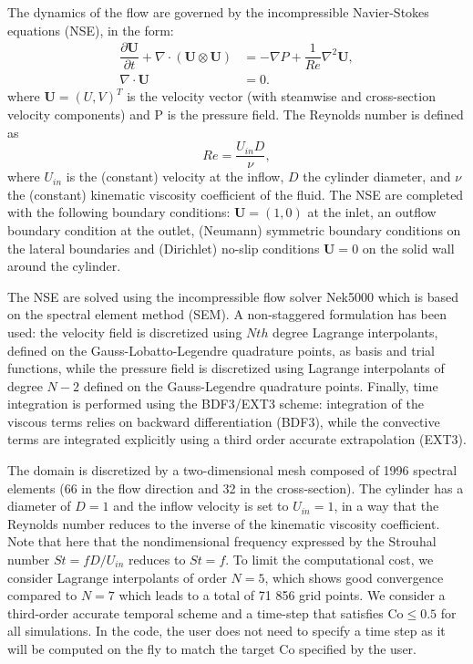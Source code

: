 \documentclass{article}
\begin{document}
The dynamics of the flow are governed by the incompressible Navier-Stokes equations (NSE), in the form:
\begin{align}
\dfrac{\partial \mathbf{U}}{\partial t} + \nabla \cdot \left( \mathbf{U} \otimes \mathbf{U} \right) &= -\nabla P + \dfrac{1}{Re} \nabla^2 \mathbf{U},\\
\nabla \cdot \mathbf{U}&=0.
\end{align}
where $\mathbf{U}=(U,V)^T$ is the velocity vector (with steamwise and cross-section velocity components) and P is the pressure field. The Reynolds number is defined as
%
\begin{equation}
    Re = \dfrac{U_{in} D}{\nu},
\end{equation}
%
where $U_{in}$ is the (constant) velocity at the inflow, $D$ the cylinder diameter, and $\nu$ the (constant) kinematic viscosity coefficient of the fluid.
The NSE are completed with the following boundary conditions: $\mathbf{U} = (1, 0)$ at the inlet, an outflow boundary condition at the outlet, (Neumann) symmetric boundary conditions on the lateral boundaries and (Dirichlet) no-slip conditions $\mathbf{U} = 0$ on the solid wall around the cylinder.

The NSE are solved using the incompressible flow solver Nek5000 which is based on the spectral element method (SEM).
A non-staggered formulation has been used: the velocity field is discretized using $Nth$ degree Lagrange interpolants, defined on the Gauss-Lobatto-Legendre quadrature points, as basis and trial functions, while the pressure field is discretized using Lagrange interpolants of degree $N-2$ defined on the Gauss-Legendre quadrature points.
Finally, time integration is performed using the BDF3/EXT3 scheme: integration of the viscous terms relies on backward differentiation (BDF3), while the convective terms are integrated explicitly using a third order accurate extrapolation (EXT3).
   
The domain is discretized by a two-dimensional mesh composed of 1996 spectral elements (66 in the flow direction and 32 in the cross-section). The cylinder has a diameter of $D=1$ and the inflow velocity is set to $U_{in}=1$, in a way that the Reynolds number reduces to the inverse of the kinematic viscosity coefficient.
Note that here that the nondimensional frequency expressed by the Strouhal number $St=fD/U_{in}$ reduces to $St=f$.
To limit the computational cost, we consider Lagrange interpolants of order $N=5$, which shows good convergence compared to $N=7$ which leads to a total of 71 856 grid points.
We consider a third-order accurate temporal scheme and a time-step that satisfies $\mathrm{Co} \le 0.5$ for all simulations. In the code, the user does not need to specify a time step as it will be computed on the fly to match the target $\mathrm{Co}$ specified by the user.
\end{document}

